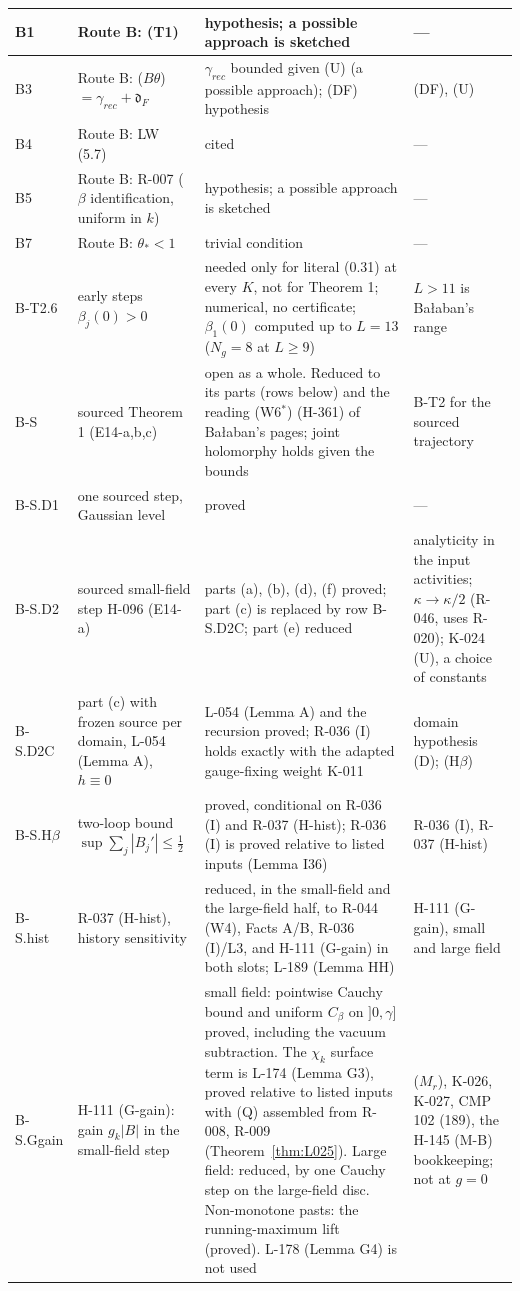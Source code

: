 \begin{longtable}{|p{1.3cm}|p{3.3cm}|p{6.2cm}|p{3.6cm}|}
B1 & Route B: (T1) & hypothesis; a possible approach is sketched & --- \\ \hline
B3 & Route B: ($B\theta$) $=\gamma_{rec}+\mathfrak d_F$ & $\gamma_{rec}$ bounded given (U) (a possible approach); (DF) hypothesis & (DF), (U) \\ \hline
B4 & Route B: LW (5.7) & cited \cite{luscherweisz1995} & --- \\ \hline
B5 & Route B: R-007 ($\beta$ identification, uniform in $k$) & hypothesis; a possible approach is sketched & --- \\ \hline
B7 & Route B: $\theta_*<1$ & trivial condition & --- \\ \hline
B-T2.6 & early steps $\beta_j(0)>0$ & needed only for literal (0.31) at every $K$, not for Theorem 1; numerical, no certificate; $\beta_1(0)$ computed up to $L=13$ ($N_g=8$ at $L\ge9$) & $L>11$ is Ba{\l}aban's range \\ \hline
B-S & sourced Theorem 1 (E14-a,b,c) & open as a whole. Reduced to its parts (rows below) and the reading (W6$^*$) (H-361) of Ba{\l}aban's pages; joint holomorphy holds given the bounds & B-T2 for the sourced trajectory \\ \hline
B-S.D1 & one sourced step, Gaussian level & proved & --- \\ \hline
B-S.D2 & sourced small-field step H-096 (E14-a) & parts (a), (b), (d), (f) proved; part (c) is replaced by row B-S.D2C; part (e) reduced & analyticity in the input activities; $\kappa\to\kappa/2$ (R-046, uses R-020); K-024 (U), a choice of constants \\ \hline
B-S.D2C & part (c) with frozen source per domain, L-054 (Lemma A), $h\equiv0$ & L-054 (Lemma A) and the recursion proved; R-036 (I) holds exactly with the adapted gauge-fixing weight K-011 & domain hypothesis (D); (H$\beta$) \\ \hline
B-S.H$\beta$ & two-loop bound $\sup\sum_j|B_j'|\le\tfrac12$ & proved, conditional on R-036 (I) and R-037 (H-hist); R-036 (I) is proved relative to listed inputs (Lemma I36) & R-036 (I), R-037 (H-hist) \\ \hline
B-S.hist & R-037 (H-hist), history sensitivity & reduced, in the small-field and the large-field half, to R-044 (W4), Facts A/B, R-036 (I)/L3, and H-111 (G-gain) in both slots; L-189 (Lemma HH) & H-111 (G-gain), small and large field \\ \hline
B-S.Ggain & H-111 (G-gain): gain $g_k|B|$ in the small-field step & small field: pointwise Cauchy bound and uniform $C_\beta$ on $]0,\gamma]$ proved, including the vacuum subtraction. The $\chi_k$ surface term is L-174 (Lemma G3), proved relative to listed inputs with (Q) assembled from R-008, R-009 (Theorem~\ref{thm:L025}). Large field: reduced, by one Cauchy step on the large-field disc. Non-monotone pasts: the running-maximum lift (proved). L-178 (Lemma G4) is not used & ($M_r$), K-026, K-027, CMP 102 (189), the H-145 (M-B) bookkeeping; not at $g=0$ \\ \hline

\end{longtable}
